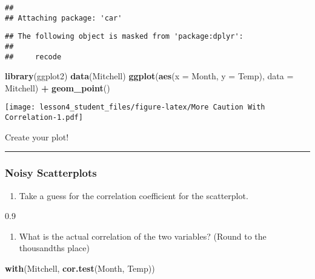 \documentclass[]{article}
\newenvironment{Shaded}{\begin{snugshade}}{\end{snugshade}}
\newcommand{\KeywordTok}[1]{\textcolor[rgb]{0.13,0.29,0.53}{\textbf{#1}}}
\newcommand{\DataTypeTok}[1]{\textcolor[rgb]{0.13,0.29,0.53}{#1}}
\newcommand{\StringTok}[1]{\textcolor[rgb]{0.31,0.60,0.02}{#1}}
\newcommand{\OperatorTok}[1]{\textcolor[rgb]{0.81,0.36,0.00}{\textbf{#1}}}
\newcommand{\NormalTok}[1]{#1}
\providecommand{\tightlist}{%
  \setlength{\itemsep}{0pt}\setlength{\parskip}{0pt}}
\begin{document}
\begin{verbatim}
## 
## Attaching package: 'car'
\end{verbatim}

\begin{verbatim}
## The following object is masked from 'package:dplyr':
## 
##     recode
\end{verbatim}

\begin{Shaded}
\begin{Highlighting}[]
\KeywordTok{library}\NormalTok{(ggplot2)}
\KeywordTok{data}\NormalTok{(Mitchell)}
\KeywordTok{ggplot}\NormalTok{(}\KeywordTok{aes}\NormalTok{(}\DataTypeTok{x =}\NormalTok{ Month, }\DataTypeTok{y =}\NormalTok{ Temp), }\DataTypeTok{data =}\NormalTok{ Mitchell) }\OperatorTok{+}
\StringTok{  }\KeywordTok{geom_point}\NormalTok{()}
\end{Highlighting}
\end{Shaded}

\texttt{[image: lesson4\_student\_files/figure-latex/More Caution With Correlation-1.pdf]}

Create your plot!

\begin{center}\rule{0.5\linewidth}{\linethickness}\end{center}

\subsubsection{Noisy Scatterplots}\label{noisy-scatterplots}

\begin{enumerate}
\def\labelenumi{\alph{enumi}.}
\tightlist
\item
  Take a guess for the correlation coefficient for the scatterplot.
\end{enumerate}

0.9

\begin{enumerate}
\def\labelenumi{\alph{enumi}.}
\setcounter{enumi}{1}
\tightlist
\item
  What is the actual correlation of the two variables? (Round to the
  thousandths place)
\end{enumerate}

\begin{Shaded}
\begin{Highlighting}[]
\KeywordTok{with}\NormalTok{(Mitchell, }\KeywordTok{cor.test}\NormalTok{(Month, Temp))}
\end{Highlighting}
\end{Shaded}
\end{document}
